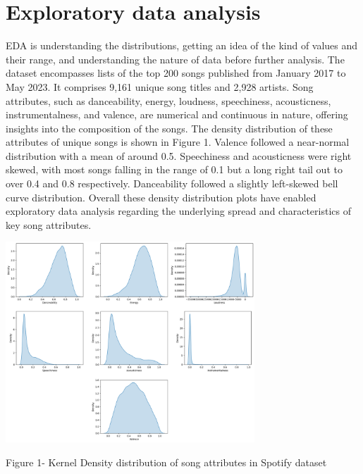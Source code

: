 \documentclass{article}
\begin{document}
\section{Exploratory data analysis}
EDA is understanding the distributions, getting an idea of the kind of values and their range, and understanding the nature of data before further analysis\cite{ghosh2023understanding}. The dataset encompasses lists of the top 200 songs published from January 2017 to May 2023. It comprises 9,161 unique song titles and 2,928 artists. Song attributes, such as danceability, energy, loudness, speechiness, acousticness, instrumentalness, and valence, are numerical and continuous in nature, offering insights into the composition of the songs. The density distribution of these attributes of unique songs is shown in Figure 1. Valence followed a near-normal distribution with a mean of around 0.5. Speechiness and acousticness were right skewed, with most songs falling in the range of 0.1 but a long right tail out to over 0.4 and 0.8 respectively. Danceability followed a slightly left-skewed bell curve distribution. Overall these density distribution plots have enabled exploratory data analysis regarding the underlying spread and characteristics of key song attributes.

\begin{center}
    \includegraphics[width=0.7\textwidth]{kdefinal.png}
\end{center}
\begin{center}
    \footnotesize{Figure 1- Kernel Density distribution of song attributes in Spotify dataset}   
\end{center}
\end{document}
